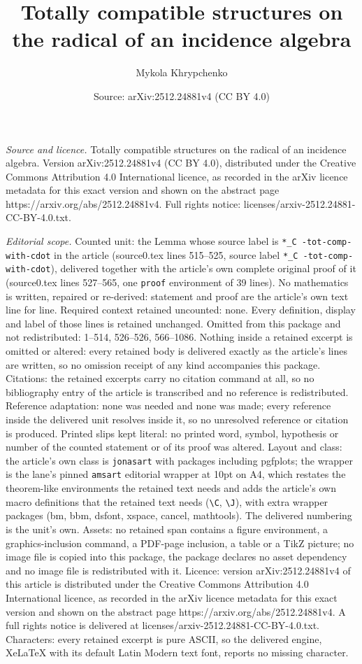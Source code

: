 \documentclass[10pt,a4paper]{amsart}
\title[Totally compatible structures on the radical of an incidence]{Totally compatible structures on the radical of an incidence algebra}
\author{Mykola Khrypchenko}
\date{Source: arXiv:2512.24881v4 (CC BY 4.0)}
\begin{document}
\maketitle

\noindent\emph{Source and licence.} Totally compatible structures on the radical of an incidence algebra. Version arXiv:2512.24881v4 (CC BY 4.0), distributed under the Creative Commons Attribution 4.0 International licence, as recorded in the arXiv licence metadata for this exact version and shown on the abstract page https://arxiv.org/abs/2512.24881v4. Full rights notice: licenses/arxiv-2512.24881-CC-BY-4.0.txt.\par\smallskip

\noindent\textit{Editorial scope.} Counted unit: the Lemma whose source label is \texttt{*\_C -tot-comp-with-cdot} in the article (source0.tex lines 515--525, source label \texttt{*\_C -tot-comp-with-cdot}), delivered together with the article's own complete original proof of it (source0.tex lines 527--565, one \texttt{proof} environment of 39 lines). No mathematics is written, repaired or re-derived: statement and proof are the article's own text line for line. Required context retained uncounted: none. Every definition, display and label of those lines is retained unchanged. Omitted from this package and not redistributed: 1--514, 526--526, 566--1086. Nothing inside a retained excerpt is omitted or altered: every retained body is delivered exactly as the article's lines are written, so no omission receipt of any kind accompanies this package. Citations: the retained excerpts carry no citation command at all, so no bibliography entry of the article is transcribed and no reference is redistributed. Reference adaptation: none was needed and none was made; every reference inside the delivered unit resolves inside it, so no unresolved reference or citation is produced. Printed slips kept literal: no printed word, symbol, hypothesis or number of the counted statement or of its proof was altered. Layout and class: the article's own class is \texttt{jonasart} with packages including pgfplots; the wrapper is the lane's pinned \texttt{amsart} editorial wrapper at 10pt on A4, which restates the theorem-like environments the retained text needs and adds the article's own macro definitions that the retained text needs (\texttt{\textbackslash C}, \texttt{\textbackslash J}), with extra wrapper packages (bm, bbm, dsfont, xspace, cancel, mathtools). The delivered numbering is the unit's own. Assets: no retained span contains a figure environment, a graphics-inclusion command, a PDF-page inclusion, a table or a TikZ picture; no image file is copied into this package, the package declares no asset dependency and no image file is redistributed with it. Licence: version arXiv:2512.24881v4 of this article is distributed under the Creative Commons Attribution 4.0 International licence, as recorded in the arXiv licence metadata for this exact version and shown on the abstract page https://arxiv.org/abs/2512.24881v4. A full rights notice is delivered at licenses/arxiv-2512.24881-CC-BY-4.0.txt. Characters: every retained excerpt is pure ASCII, so the delivered engine, XeLaTeX with its default Latin Modern text font, reports no missing character.
\end{document}
